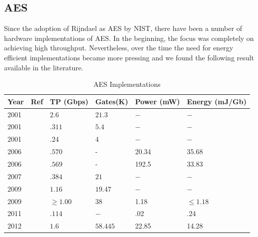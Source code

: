 \documentclass[lnicst,sechang,a4paper]{svmultln}
\begin{document}
\subsection{AES} Since the adoption of Rijndael as AES by NIST, there have been a number of hardware implementations of AES. In the beginning, the focus was completely on achieving high throughput. Nevertheless, over the time the need for energy efficient implementations became more pressing and we found the following result available in the literature. \newline


\begin{table}
\begin{center}
\begin{tabular}{|p{}
				|p{}
				|p{}
				|p{}
				|p{}
				|p{}|
				}
\hline
Year & Ref & TP (Gbps) & Gates(K) & Power (mW) & Energy (mJ/Gb) \\
\hline
2001 & \cite{IBM_Japan_2001} &$2.6$ &$21.3$  & $-$ & $-$ \\ \hline
2001 & \cite{IBM_Japan_2001} &$.311$ &$5.4$  & $-$ & $-$ \\ \hline
2001 & \cite{IBM_India_IIT_2001} &$.24$ &$4$  & $-$ & $-$ \\ \hline
2006 & \cite{Taiwan_2006} &$.570$ & - &20.34 & 35.68 \\ \hline
2006 & \cite{Taiwan_2006} &$.569$ & - &192.5 & 33.83 \\ \hline
2007 & \cite{IIT_Kharagpur_2007} &$.384$ &$21$ & $-$  & $-$ \\ \hline
2009 & \cite{IME_China_Tsinghua_Univerisity_2009} &$1.16$ &$19.47$ & $-$ & $-$ \\ \hline
2009 & \cite{Ruhr_2009} &$\geq 1.00$ &$38$ &1.18 & $\leq 1.18$ \\ \hline
2011 & \cite{Ruhr_2011} &$.114$ &$ - $ &.02 & .24 \\ \hline
2012 & \cite{Pune_2012} &$1.6$ &$58.445$ &22.85 & 14.28 \\ \hline
\end{tabular}
\end{center}
\caption{AES Implementations}
\label{table:aes_implementation}
\end{table}
\end{document}
